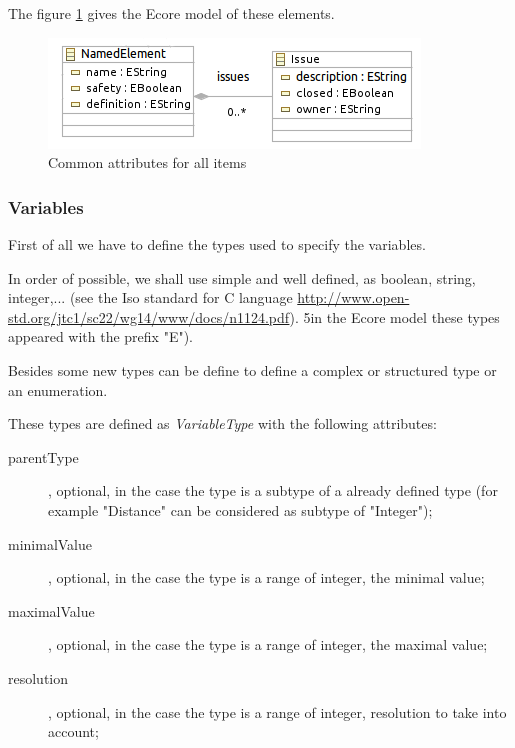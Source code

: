 The figure \ref{fig:Common} gives the Ecore model of these elements.

\begin{figure}[ht]
  \centering
  \includegraphics{DataModel/Common2.png}
  \caption{Common attributes for all items}
  \label{fig:Common}
\end{figure}


\subsubsection{Variables}
\label{sec:var}


First of all we have to define the types used to specify the variables.

In order of possible, we shall use simple and well defined, as boolean, string, integer,... (see the Iso standard for C language \url{http://www.open-std.org/jtc1/sc22/wg14/www/docs/n1124.pdf}). 5in the Ecore model these types appeared with the prefix "E").

Besides some new types can be define to define a complex or structured type or an enumeration.

These types are defined as \textit{VariableType} with the following attributes:
\begin{description}
\item[parentType], optional, in the case the type is a subtype of a  already defined type (for example "Distance" can be considered as subtype of "Integer");
\item[minimalValue], optional, in the case the type is a range of integer, the minimal value;
\item[maximalValue], optional, in the case the type is a range of integer, the maximal value;
\item[resolution], optional, in the case the type is a range of integer, resolution to take into account;
\end{description}

